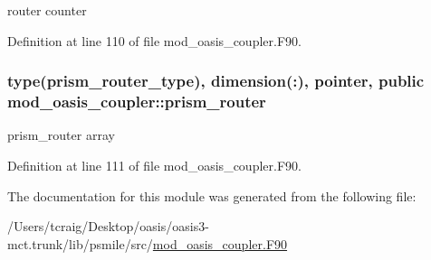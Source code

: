 router counter 



Definition at line 110 of file mod\+\_\+oasis\+\_\+coupler.\+F90.

\hypertarget{classmod__oasis__coupler_a33dbf692ad73f83f73fe083e252badd8}{
\subsubsection[{prism\+\_\+router}]{\setlength{\rightskip}{0pt plus 5cm}type({\bf prism\+\_\+router\+\_\+type}), dimension(\+:), pointer, public mod\+\_\+oasis\+\_\+coupler\+::prism\+\_\+router}}\label{classmod__oasis__coupler_a33dbf692ad73f83f73fe083e252badd8}


prism\+\_\+router array 



Definition at line 111 of file mod\+\_\+oasis\+\_\+coupler.\+F90.



The documentation for this module was generated from the following file\+:\begin{DoxyCompactItemize}
\item 
/\+Users/tcraig/\+Desktop/oasis/oasis3-\/mct.\+trunk/lib/psmile/src/\hyperlink{mod__oasis__coupler_8_f90}{mod\+\_\+oasis\+\_\+coupler.\+F90}\end{DoxyCompactItemize}
